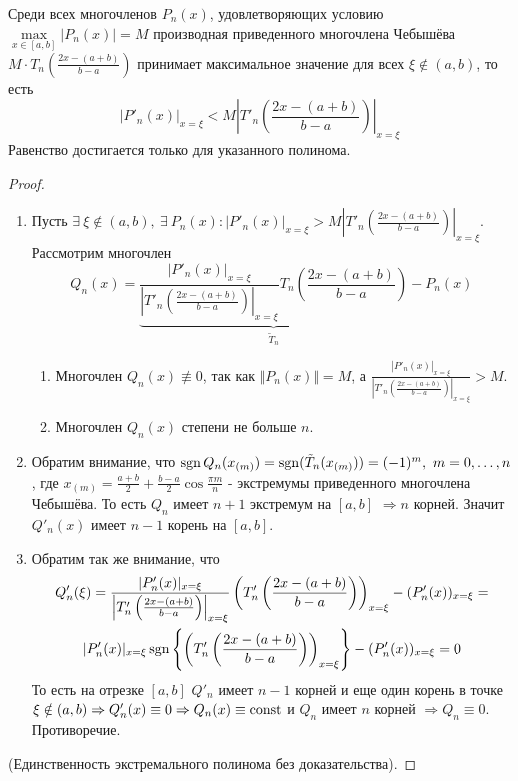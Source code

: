 \begin{theorem}[Марков А.А]
  Среди всех многочленов $P_n(x)$, удовлетворяющих условию $\max\limits_{x\in[a,b]}|P_n(x)|=M$
  производная приведенного многочлена Чебышёва $M\cdot T_n\left(\frac{2x-(a+b)}{b-a}\right)$ принимает максимальное значение
  для всех $\xi\notin(a,b)$, то есть
  \[|P'_n(x)|_{x=\xi}<M\left|T'_n\left(\frac{2x-(a+b)}{b-a}\right)\right|_{x=\xi}\]
  Равенство достигается только для указанного полинома.
\end{theorem}
\begin{proof}
  \begin{enumerate}
    \item Пусть $\exists\ \xi\notin(a,b),\ \exists\ P_n(x): |P'_n(x)|_{x=\xi}>M\left|T'_n\left(\frac{2x-(a+b)}{b-a}\right)\right|_{x=\xi}$. Рассмотрим многочлен
          \[Q_n(x)=\underbrace{\frac{|P'_n(x)|_{x=\xi}}{\left|T'_n\left(\frac{2x-(a+b)}{b-a}\right)\right|_{x=\xi}}T_n\left(\frac{2x-(a+b)}{b-a}\right)}_{\tilde{T}_n} - P_n(x)\]
          \begin{enumerate}
            \item Многочлен $Q_n(x)\not\equiv0$, так как $\Vert P_n(x)\Vert=M$, а $\frac{|P'_n(x)|_{x=\xi}}{\left|T'_n\left(\frac{2x-(a+b)}{b-a}\right)\right|_{x=\xi}}>M$.
            \item Многочлен $Q_n(x)$ степени не больше $n$.
          \end{enumerate}
    \item Обратим внимание, что $\operatorname{sgn} Q_n(x_{(m)})=\operatorname{sgn}(\tilde{T}_n(x_{(m)}))=(-1)^m,\ m=0,\ldots,n$, где $x_{(m)}=\frac{a+b}{2}+\frac{b-a}{2}\cos\frac{\pi m}{n}$
          - экстремумы приведенного многочлена Чебышёва. То есть $Q_n$ имеет $n+1$ экстремум на $[a,b]$ $\Rightarrow n$ корней. Значит $Q'_n(x)$ имеет $n-1$ корень на $[a,b]$.
    \item Обратим так же внимание, что
          \begin{multline*}
            Q'_n(\xi)=\frac{|P'_n(x)|_{x=\xi}}{\left|T'_n\left(\frac{2x-(a+b)}{b-a}\right)\right|_{x=\xi}}\left(T'_n\left(\frac{2x-(a+b)}{b-a}\right)\right)_{x=\xi} - (P'_n(x))_{x=\xi}=\\
            |P'_n(x)|_{x=\xi}\operatorname{sgn}\left\{\left(T'_n\left(\frac{2x-(a+b)}{b-a}\right)\right)_{x=\xi}\right\} - (P'_n(x))_{x=\xi}=0
          \end{multline*}
          То есть на отрезке $[a,b]$
          $Q'_n$ имеет $n-1$ корней и еще один корень
          в точке $\xi\notin(a,b)\Rightarrow Q'_n(x)\equiv0\Rightarrow Q_n(x)\equiv\mathrm{const}$ и $Q_n$ имеет $n$ корней $\Rightarrow Q_n\equiv0$. Противоречие.
  \end{enumerate}
  (Единственность экстремального полинома без доказательства).
\end{proof}
